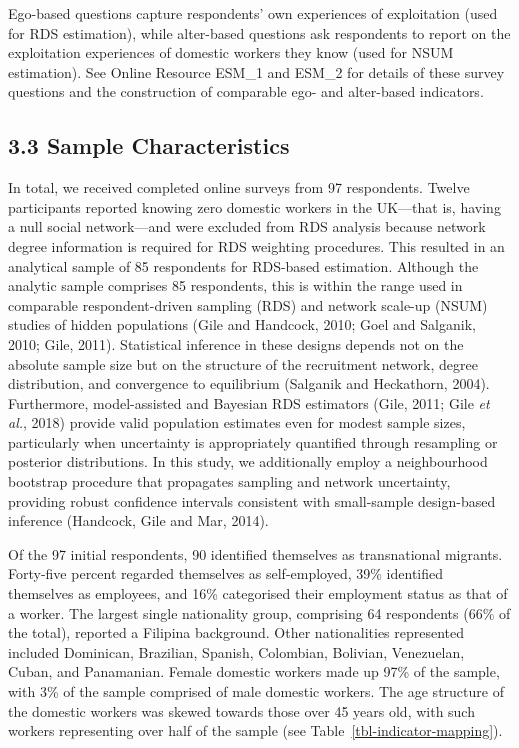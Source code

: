 \documentclass[
  12pt,
  letterpaper,
  DIV=11,
  numbers=noendperiod]{scrartcl}
\begin{document}
Ego-based questions capture respondents' own experiences of exploitation
(used for RDS estimation), while alter-based questions ask respondents
to report on the exploitation experiences of domestic workers they know
(used for NSUM estimation). See Online Resource ESM\_1 and ESM\_2 for
details of these survey questions and the construction of comparable
ego- and alter-based indicators.

\subsection{3.3 Sample
Characteristics}\label{sec-sample-characteristics}

In total, we received completed online surveys from 97 respondents.
Twelve participants reported knowing zero domestic workers in the
UK---that is, having a null social network---and were excluded from RDS
analysis because network degree information is required for RDS
weighting procedures. This resulted in an analytical sample of 85
respondents for RDS-based estimation. Although the analytic sample
comprises 85 respondents, this is within the range used in comparable
respondent-driven sampling (RDS) and network scale-up (NSUM) studies of
hidden populations (Gile and Handcock, 2010; Goel and Salganik, 2010;
Gile, 2011). Statistical inference in these designs depends not on the
absolute sample size but on the structure of the recruitment network,
degree distribution, and convergence to equilibrium (Salganik and
Heckathorn, 2004). Furthermore, model-assisted and Bayesian RDS
estimators (Gile, 2011; Gile \emph{et al.}, 2018) provide valid
population estimates even for modest sample sizes, particularly when
uncertainty is appropriately quantified through resampling or posterior
distributions. In this study, we additionally employ a neighbourhood
bootstrap procedure that propagates sampling and network uncertainty,
providing robust confidence intervals consistent with small-sample
design-based inference (Handcock, Gile and Mar, 2014).

Of the 97 initial respondents, 90 identified themselves as transnational
migrants. Forty-five percent regarded themselves as self-employed, 39\%
identified themselves as employees, and 16\% categorised their
employment status as that of a worker. The largest single nationality
group, comprising 64 respondents (66\% of the total), reported a
Filipina background. Other nationalities represented included Dominican,
Brazilian, Spanish, Colombian, Bolivian, Venezuelan, Cuban, and
Panamanian. Female domestic workers made up 97\% of the sample, with 3\%
of the sample comprised of male domestic workers. The age structure of
the domestic workers was skewed towards those over 45 years old, with
such workers representing over half of the sample (see
Table~\ref{tbl-indicator-mapping}).
\end{document}
